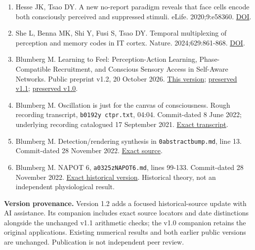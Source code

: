 \documentclass[
  american,
  11pt,
  letterpaper,
]{article}
\begin{document}
\begin{enumerate}
\item
  Hesse JK, Tsao DY. A new no-report paradigm reveals that face cells encode both consciously perceived and suppressed stimuli. eLife. 2020;9:e58360. \href{https://doi.org/10.7554/eLife.58360}{DOI}.
\item
  She L, Benna MK, Shi Y, Fusi S, Tsao DY. Temporal multiplexing of perception and memory codes in IT cortex. Nature. 2024;629:861-868. \href{https://doi.org/10.1038/s41586-024-07349-5}{DOI}.
\item
  Blumberg M. Learning to Feel: Perception-Action Learning, Phase-Compatible Recruitment, and Conscious Sensory Access in Self-Aware Networks. Public preprint v1.2, 20 October 2026. \href{https://doi.org/10.5281/zenodo.23509961}{This version}; \href{https://doi.org/10.5281/zenodo.23455801}{preserved v1.1}; \href{https://doi.org/10.5281/zenodo.23447925}{preserved v1.0}.
\item
  Blumberg M. Oscillation is just for the canvas of consciousness. Rough recording transcript, \texttt{b0192y\ ctpr.txt}, 04:04. Commit-dated 8 June 2022; underlying recording catalogued 17 September 2021. \href{https://github.com/v5ma/selfawarenetworks/blob/09b8306fbb54536e20ba1071e91dff0cb8a4770f/b0192y\%20ctpr.txt\#L21}{Exact transcript}.
\item
  Blumberg M. Detection/rendering synthesis in \texttt{0abstractbump.md}, line 13. Commit-dated 28 November 2022. \href{https://github.com/v5ma/selfawarenetworks/blob/4e0cf1ee0975c01dc57182368497d3f0cd864030/0abstractbump.md\#L13}{Exact source}.
\item
  Blumberg M. NAPOT 6, \texttt{a0325zNAPOT6.md}, lines 99-133. Commit-dated 28 November 2022. \href{https://github.com/v5ma/selfawarenetworks/blob/4e0cf1ee0975c01dc57182368497d3f0cd864030/a0325zNAPOT6.md\#L99}{Exact historical version}. Historical theory, not an independent physiological result.
\end{enumerate}

\endgroup
\begingroup\small\par\smallskip\noindent\textbf{Version provenance.}\label{successor-provenance} Version 1.2 adds a focused historical-source update with AI assistance. Its companion includes exact source locators and date distinctions alongside the unchanged v1.1 arithmetic checks; the v1.0 companion retains the original applications. Existing numerical results and both earlier public versions are unchanged. Publication is not independent peer review.

\endgroup
\end{document}
